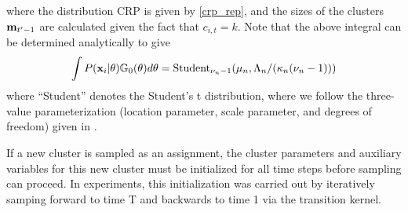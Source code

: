 \documentclass[smallcondensed, final]{svjour3}
\begin{document}
where the distribution CRP is given by \eqref{crp_rep}, and the sizes of the clusters $\bold{m}_{t'-1}$ are calculated given the fact that $c_{i,t} = k$. Note that the above integral can be determined analytically to give
\begin{equation}
\label{marginal_obs_prob}
\int P(\bold{x}_{i} | \theta) \mathbb{G}_{0}(\theta)d\theta = \text{Student}_{\nu_{n} - 1}(\mu_{n}, \Lambda_{n}/(\kappa_{n}(\nu_{n}-1)))
\end{equation}
where ``Student'' denotes the Student's t distribution, where we follow the three-value parameterization (location parameter, scale parameter, and degrees of freedom) given in \cite{gelman2004bayesian}.



If a new cluster is sampled as an assignment, the cluster parameters and auxiliary variables for this new cluster must be initialized for all time steps before sampling can proceed. In experiments, this initialization was carried out by iteratively samping forward to time T and backwards to time 1 via the transition kernel.





\end{document}
